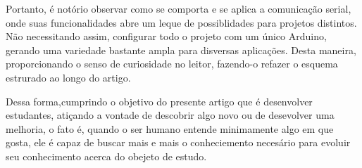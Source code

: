 \documentclass[conference]{IEEEtran}
\begin{document}
Portanto, é notório observar como se comporta e se aplica a comunicação serial, onde suas 
funcionalidades abre um leque de possiblidades para projetos distintos. Não necessitando assim, configurar todo o projeto com um
único Arduino, gerando uma variedade bastante ampla para disversas aplicações. Desta maneira, proporcionando o senso de curiosidade no leitor,
fazendo-o refazer o esquema estrurado ao longo do artigo.

Dessa forma,cumprindo o objetivo do presente artigo que é desenvolver estudantes, atiçando a vontade de descobrir algo novo ou
de desevolver uma melhoria, o fato é, quando o ser humano entende minimamente algo em que gosta, ele é capaz de buscar mais e mais
o conheciemento necesário para evoluir seu conhecimento acerca do obejeto de estudo.  




\end{document}
